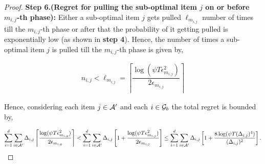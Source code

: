 \begin{proof}
\textbf{Step 6.(Regret for pulling the sub-optimal item $j$ on or before $m_{i,j}$-th phase):} Either a sub-optimal item $j$ gets pulled $\ell_{m_{i,j}}$ number of times till the $m_{i,j}$-th phase or after that the probability of it getting pulled is exponentially low (as shown in \textbf{step 4}). Hence, the number of times a sub-optimal item $j$ is pulled till the $m_{i,j}$-th phase is given by,

\begin{align*}
n_{i,j} < \ell_{m_{i,j}} = \left\lceil \dfrac{\log(\psi T\epsilon_{m_{i,j}}^2)}{2\epsilon_{m_{i,j}}} \right\rceil
\end{align*}

Hence, considering each item $j\in\mathcal{A}'$ and each $i\in\mathcal{G}_b$ the total regret is bounded by,

\begin{align*}
\sum_{i=1}^{d}\sum_{i\in\mathcal{A}'}\Delta_{i,j}\left\lceil \dfrac{\log(\psi T\epsilon_{m_{i,g}}^2)}{2\epsilon_{m_{i,g}}} \right\rceil < \sum_{i=1}^{d}\sum_{i\in\mathcal{A}'}\Delta_{i,j}\left[ 1 + \dfrac{\log(\psi T\epsilon_{m_{i,j}}^2)}{2\epsilon_{m_{i,j}}} \right] \leq  \sum_{i=1}^{d}\sum_{i\in\mathcal{A}'}\Delta_{i,j}\left[ 1 + \dfrac{8\log(\psi T(\Delta_{i,j})^4)}{(\Delta_{i,j})^2}\right].
\end{align*} 


%
%

\end{proof}